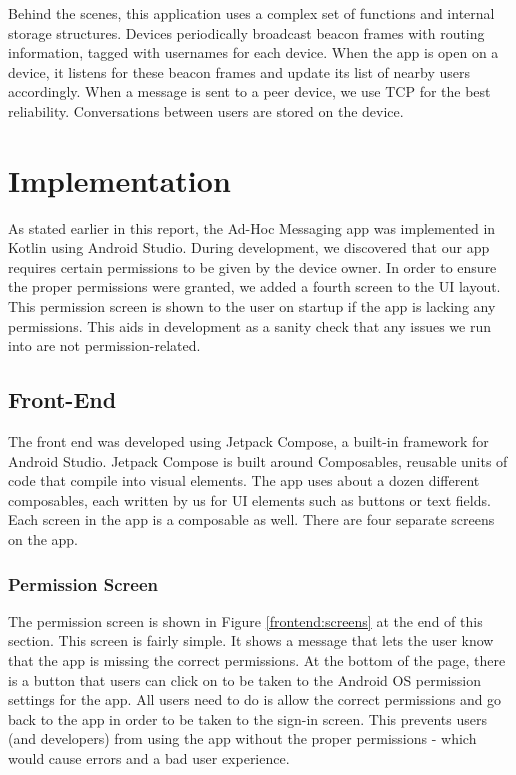 \documentclass[10pt]{article}
\begin{document}
Behind the scenes, this application uses a complex set of functions and internal storage structures. Devices  periodically broadcast beacon frames with routing information, tagged with usernames for each device. When the app is open on a device, it listens for these beacon frames and update its list of nearby users accordingly. When a message is sent to a peer device, we use TCP for the best reliability. Conversations between users are stored on the device.

\section{Implementation}

As stated earlier in this report, the Ad-Hoc Messaging app was implemented in Kotlin using Android Studio. During development, we discovered that our app requires certain permissions to be given by the device owner. In order to ensure the proper permissions were granted, we added a fourth screen to the UI layout. This permission screen is shown to the user on startup if the app is lacking any permissions. This aids in development as a sanity check that any issues we run into are not permission-related.

\subsection{Front-End}
The front end was developed using Jetpack Compose, a built-in framework for Android Studio. Jetpack Compose is built around Composables, reusable units of code that compile into visual elements. The app uses about a dozen different composables, each written by us for UI elements such as buttons or text fields. Each screen in the app is a composable as well.
There are four separate screens on the app. 

\subsubsection{Permission Screen}

The permission screen is shown in Figure \ref{frontend:screens} at the end of this section. This screen is fairly simple. It shows a message that lets the user know that the app is missing the correct permissions. At the bottom of the page, there is a button that users can click on to be taken to the Android OS permission settings for the app. All users need to do is allow the correct permissions and go back to the app in order to be taken to the sign-in screen. This prevents users (and developers) from using the app without the proper permissions - which would cause errors and a bad user experience.
\end{document}
